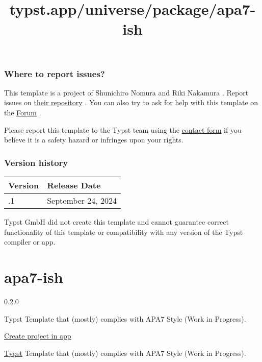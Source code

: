 \subsubsection{Where to report issues?}\label{where-to-report-issues}

This template is a project of Shunichiro Nomura and Riki Nakamura .
Report issues on
\href{https://github.com/shunichironomura/iac-typst-template}{their
repository} . You can also try to ask for help with this template on the
\href{https://forum.typst.app}{Forum} .

Please report this template to the Typst team using the
\href{https://typst.app/contact}{contact form} if you believe it is a
safety hazard or infringes upon your rights.

\label{versions}
\subsubsection{Version history}\label{version-history}

\begin{longtable}[]{@{}ll@{}}
\toprule\noalign{}
Version & Release Date \\
\midrule\noalign{}
\endhead
\bottomrule\noalign{}
\endlastfoot
0.4.1 & September 24, 2024 \\
\end{longtable}

Typst GmbH did not create this template and cannot guarantee correct
functionality of this template or compatibility with any version of the
Typst compiler or app.


\title{typst.app/universe/package/apa7-ish}

\label{banner}
\label{template-thumbnail}

\section{apa7-ish}\label{apa7-ish}

{ 0.2.0 }

Typst Template that (mostly) complies with APA7 Style (Work in
Progress).

\href{/app?template=apa7-ish&version=0.2.0}{Create project in app}

\label{readme}
\href{https://typst.app/}{Typst} Template that (mostly) complies with
APA7 Style (Work in Progress).

